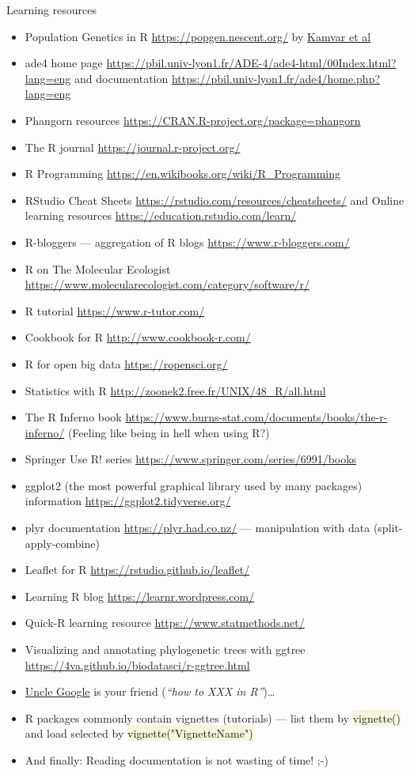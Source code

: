 \documentclass[compress, ucs, xelatex, 11pt, xcolor=svgnames, aspectratio=169,
	hyperref={
		bookmarks=true,
		unicode=true,
		colorlinks=true,
		pdftitle={Molecular data in R},
		plainpages=false,
		pdfauthor={Vojtech Zeisek},
		pdfsubject={Course about phylogeny and evolution in R},
		pdfcreator={XeLaTeX},
		pdfkeywords={R, evolution, phylogeny, molecular data},
		linkcolor=Crimson, %
		anchorcolor=Magenta, %
		citecolor=Magenta, %
		filecolor=Magenta, %
		menucolor=Magenta, %
		urlcolor=DodgerBlue, %
		pdftex},
	url={hyphens, lowtilde} %
	]{beamer}
\renewcommand{\texttt}[1]{\colorbox{Beige}{{\ttfamily #1}}}
\begin{document}
\begin{frame}[allowframebreaks]{Learning resources}
\begin{itemize}
		\item Population Genetics in R \url{https://popgen.nescent.org/} by \href{https://onlinelibrary.wiley.com/doi/full/10.1111/1755-0998.12558}{Kamvar et al}
		\item ade4 home page \url{https://pbil.univ-lyon1.fr/ADE-4/ade4-html/00Index.html?lang=eng} and documentation \url{https://pbil.univ-lyon1.fr/ade4/home.php?lang=eng}
		\item Phangorn resources \url{https://CRAN.R-project.org/package=phangorn}
		\item The R journal \url{https://journal.r-project.org/}
		\item R Programming \url{https://en.wikibooks.org/wiki/R_Programming}
		\item RStudio Cheat Sheets \url{https://rstudio.com/resources/cheatsheets/} and Online learning resources \url{https://education.rstudio.com/learn/}
		\item R-bloggers --- aggregation of R blogs \url{https://www.r-bloggers.com/}
		\item R on The Molecular Ecologist \url{https://www.molecularecologist.com/category/software/r/}
		\item R tutorial \url{https://www.r-tutor.com/}
		\item Cookbook for R  \url{http://www.cookbook-r.com/}
		\item R for open big data \url{https://ropensci.org/}
		\item Statistics with R \url{http://zoonek2.free.fr/UNIX/48_R/all.html}
		\item The R Inferno book \url{https://www.burns-stat.com/documents/books/the-r-inferno/} (Feeling like being in hell when using R?)
		\item Springer Use R! series \url{https://www.springer.com/series/6991/books}
		\item ggplot2 (the most powerful graphical library used by many packages) information \url{https://ggplot2.tidyverse.org/}
		\item plyr documentation \url{https://plyr.had.co.nz/} --- manipulation with data (split-apply-combine)
		\item Leaflet for R \url{https://rstudio.github.io/leaflet/}
		\item Learning R blog \url{https://learnr.wordpress.com/}
		\item Quick-R learning resource \url{https://www.statmethods.net/}
		\item Visualizing and annotating phylogenetic trees with ggtree \url{https://4va.github.io/biodatasci/r-ggtree.html}
		\item \href{https://rseek.org/}{Uncle Google} is your friend (\textit{\enquote{how to XXX in R}})\ldots
		\item R packages commonly contain vignettes (tutorials) --- list them by \texttt{vignette()} and load selected by \texttt{vignette("VignetteName")}
		\item And finally: \alert{Reading documentation is not wasting of time!} ;-)
	\end{itemize}
\end{frame}
\end{document}
